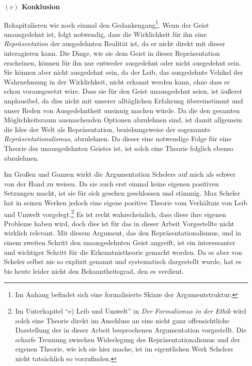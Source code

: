 \documentclass[a4paper, 12pt]{article}
\begin{document}
\begin{onehalfspace}
\vspace{5mm}
\noindent\textbf{$(v)$ Konklusion}

\noindent Rekapitulieren wir noch einmal den Gedankengang\footnote{Im Anhang befindet sich eine formalisierte Skizze der Argumentstruktur.}. Wenn der Geist unausgedehnt ist, folgt notwendig, dass die Wirklichkeit für ihn eine \emph{Repräsentation} der ausgedehnten Realität ist, da er nicht direkt mit dieser interagieren kann. Die Dinge, wie sie dem Geist in dieser Repräsentation erscheinen, können für ihn nur entweder ausgedehnt oder nicht ausgedehnt sein. Sie können aber nicht ausgedehnt sein, da der Leib, das ausgedehnte Vehikel der Wahrnehmung in der Wirklichkeit, nicht erkannt werden kann, ohne dass er schon vorausgesetzt wäre. Dass sie für den Geist unausgedehnt seien, ist äußerst unplausibel, da dies nicht mit unserer alltäglichen Erfahrung übereinstimmt und unser Reden von Ausgedehntheit unsinnig machen würde. Da die den gesamten Möglichkeitsraum ausmachenden Optionen abzulehnen sind, ist damit allgemein die Idee der Welt als Repräsentation, beziehungsweise der sogenannte \emph{Repräsentationalismus}, abzulehnen. Da dieser eine notwendige Folge für eine Theorie des unausgedehnten Geistes ist, ist solch eine Theorie folglich ebenso abzulehnen.

Im Großen und Ganzen wirkt die Argumentation Schelers auf mich als schwer von der Hand zu weisen. Da sie auch erst einmal keine eigenen positiven Setzungen macht, ist sie für sich gesehen geschlossen und stimmig. Max Scheler hat in seinen Werken jedoch eine eigene positive Theorie vom Verhältnis von Leib und Umwelt vorgelegt.\footnote{Im Unterkapitel "`e) Leib und Umwelt"' in \emph{Der Formalismus in der Ethik} \citep[Vgl.][S. 489 bis 510]{scheler-ethik} wird solch eine Theorie direkt im Anschluss an eine nicht ganz offensichtliche Darstellung der in dieser Arbeit besprochenen Argumentation vorgestellt. Die scharfe Trennung zwischen Widerlegung des Repräsentationalismus und der eigenen Theorie, wie ich sie hier mache, ist im eigentlichen Werk Schelers nicht tatsächlich so vorzufinden. } Es ist recht wahrscheinlich, dass diese ihre eigenen Probleme haben wird, doch dies ist für das in dieser Arbeit Vorgestellte nicht wirklich relevant. Mit diesem Argument, das den Repräsentationalismus, und in einem zweiten Schritt den unausgedehnten Geist angreift, ist ein interessanter und wichtiger Schritt für die Erkenntnistheorie gemacht worden. Da es aber von Scheler selbst nie so explizit genannt und systematisch dargestellt wurde, hat es bis heute leider nicht den Bekanntheitsgrad, den es verdient. %



\end{onehalfspace}
\end{document}
